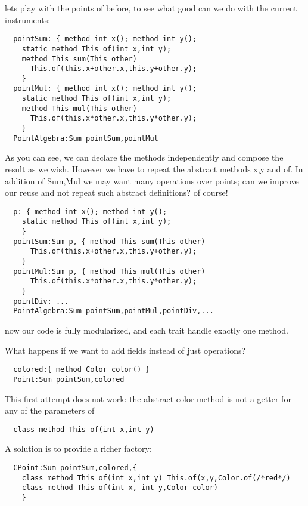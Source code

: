\documentclass{llncs}
\begin{document}
  
  lets play with the points of before, to see what good can we do with the current
  instruments:

\begin{lstlisting}
  pointSum: { method int x(); method int y();
    static method This of(int x,int y);
    method This sum(This other)
      This.of(this.x+other.x,this.y+other.y);
    }
  pointMul: { method int x(); method int y();
    static method This of(int x,int y);
    method This mul(This other)
      This.of(this.x*other.x,this.y*other.y);
    }
  PointAlgebra:Sum pointSum,pointMul
\end{lstlisting}  

  As you can see, we can declare the methods independently and compose the result
  as we wish. However we have to repeat the abstract methods x,y and of.
  In addition of Sum,Mul we may want many operations over points; can we improve our reuse
  and not repeat such abstract definitions? of course!

\begin{lstlisting}
  p: { method int x(); method int y();
    static method This of(int x,int y);
    }
  pointSum:Sum p, { method This sum(This other)
      This.of(this.x+other.x,this.y+other.y);
    }
  pointMul:Sum p, { method This mul(This other)
      This.of(this.x*other.x,this.y*other.y);
    }
  pointDiv: ...
  PointAlgebra:Sum pointSum,pointMul,pointDiv,...
\end{lstlisting}
      
now our code is fully modularized, and each trait handle exactly one method.

What happens if we want to add fields instead of just operations?

\begin{lstlisting}
  colored:{ method Color color() }
  Point:Sum pointSum,colored
\end{lstlisting}

This first attempt does not work: the abstract color method
is not a getter for any of the parameters of 

\begin{lstlisting}
  class method This of(int x,int y) 
\end{lstlisting}

A solution is to provide a richer factory:

\begin{lstlisting}
  CPoint:Sum pointSum,colored,{
    class method This of(int x,int y) This.of(x,y,Color.of(/*red*/)
    class method This of(int x, int y,Color color)
    }
\end{lstlisting}
\end{document}
